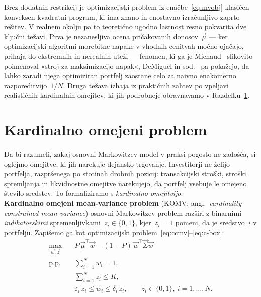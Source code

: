 Brez dodatnih restrikcij je optimizacijski problem iz enačbe~\eqref{eq:mvobj} klasičen konveksen kvadratni program, ki ima znano in enostavno izračunljivo zaprto rešitev. V realnem okolju pa to teoretično ugodno lastnost resno pokvarita dve ključni težavi. Prva je nezanesljiva ocena pričakovanih donosov~$\vec{\mu}$ --- ker optimizacijski algoritmi morebitne napake v vhodnih cenitvah močno ojačajo, prihaja do ekstremnih in nerealnih uteži --- fenomen, ki ga je Michaud~\cite{michaud1989} slikovito poimenoval »stroj za maksimizacijo napak«, DeMiguel in sod.~\cite{demiguel2009} pa pokažejo, da lahko zaradi njega optimiziran portfelj zaostane celo za naivno enakomerno razporeditvijo~$1/N$. Druga težava izhaja iz praktičnih zahtev po vpeljavi realističnih kardinalnih omejitev, ki jih podrobneje obravnavamo v Razdelku~\ref{sec:ccmv}.\\

\newpage

\section{Kardinalno omejeni problem}
\label{sec:ccmv}

Da bi razumeli, zakaj osnovni Markowitzev model v praksi pogosto ne zadošča, si oglejmo omejitve, ki jih narekuje dejansko trgovanje. Investitorji ne želijo portfelja, razpršenega po stotinah drobnih pozicij: transakcijski stroški, stroški spremljanja in likvidnostne omejitve narekujejo, da portfelj vsebuje le omejeno število sredstev. To formaliziramo s \emph{kardinalno omejitvijo}.\\

\noindent\textbf{Kardinalno omejeni mean-variance problem} (KOMV; angl.\ \emph{cardinality-constrained mean-variance}) osnovni Markowitzev problem razširi z binarnimi \emph{indikatorskimi} spremenljivkami~$z_i\in\{0,1\}$, kjer~$z_i=1$ pomeni, da je sredstvo~$i$ v portfelju. Zapišemo ga kot optimizacijski problem~\eqref{eq:ccmv}--\eqref{eq:c-box}:
\begin{align}
  \max_{\vec{w},\vec{z}} \quad & P\,\vec{\mu}^{\!\top}\vec{w} - (1-P)\,\vec{w}^{\!\top}\vec{\Sigma}\vec{w} \label{eq:ccmv}\\
  \text{p.p.} \quad & \textstyle\sum_{i=1}^N w_i = 1, \label{eq:c-sum}\\
  & \textstyle\sum_{i=1}^N z_i \le K, \label{eq:c-card}\\
  & \varepsilon_i\, z_i \le w_i \le \delta_i\, z_i, \qquad z_i\in\{0,1\},\ i=1,\dots,N. \label{eq:c-box}
\end{align}

